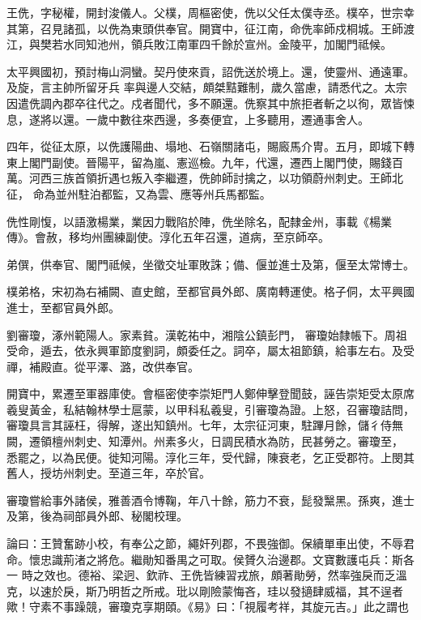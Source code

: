 \begin{pinyinscope}
 王侁，字秘權，開封浚儀人。父樸，周樞密使，侁以父任太僕寺丞。樸卒，世宗幸其第，召見諸孤，以侁為東頭供奉官。開寶中，征江南，命侁率師戍桐城。王師渡江，與樊若水同知池州，領兵敗江南軍四千餘於宣州。金陵平，加閣門祗候。



 太平興國初，預討梅山洞蠻。契丹使來貢，詔侁送於境上。還，使靈州、通遠軍。及旋，言主帥所留牙兵
 率與邊人交結，頗桀黠難制，歲久當慮，請悉代之。太宗因遣侁調內郡卒往代之。戍者聞代，多不願還。侁察其中旅拒者斬之以徇，眾皆悚息，遂將以還。一歲中數往來西邊，多奏便宜，上多聽用，遷通事舍人。



 四年，從征太原，以侁護陽曲、塌地、石嶺關諸屯，賜廄馬介冑。五月，即城下轉東上閣門副使。晉陽平，留為嵐、憲巡檢。九年，代還，遷西上閣門使，賜錢百萬。河西三族首領折遇乜叛入李繼遷，侁帥師討擒之，以功領蔚州刺史。王師北征，
 命為並州駐泊都監，又為雲、應等州兵馬都監。



 侁性剛愎，以語激楊業，業因力戰陷於陣，侁坐除名，配隸金州，事載《楊業傳》。會赦，移均州團練副使。淳化五年召還，道病，至京師卒。



 弟僎，供奉官、閣門祗候，坐徵交址軍敗誅；備、偃並進士及第，偃至太常博士。



 樸弟格，宋初為右補闕、直史館，至都官員外郎、廣南轉運使。格子侗，太平興國進士，至都官員外郎。



 劉審瓊，涿州範陽人。家素貧。漢乾祐中，湘陰公鎮彭門，
 審瓊始隸帳下。周祖受命，遁去，依永興軍節度劉詞，頗委任之。詞卒，屬太祖節鎮，給事左右。及受禪，補殿直。從平澤、潞，改供奉官。



 開寶中，累遷至軍器庫使。會樞密使李崇矩門人鄭伸擊登聞鼓，誣告崇矩受太原席羲叟黃金，私結翰林學士扈蒙，以甲科私羲叟，引審瓊為證。上怒，召審瓊詰問，審瓊具言其誣枉，得解，遂出知鎮州。七年，太宗征河東，駐蹕月餘，儲彳侍無闕，遷領檀州刺史、知潭州。州素多火，日調民積水為防，民甚勞之。審瓊至，
 悉罷之，以為民便。徙知河陽。淳化三年，受代歸，陳衰老，乞正受郡符。上閔其舊人，授坊州刺史。至道三年，卒於官。



 審瓊嘗給事外諸侯，雅善酒令博鞠，年八十餘，筋力不衰，髭發黳黑。孫爽，進士及第，後為祠部員外郎、秘閣校理。



 論曰：王贊奮跡小校，有奉公之節，繩奸列郡，不畏強御。保續單車出使，不辱君命。懷忠識荊渚之將危。繼勛知番禺之可取。侯贇久治邊郡。文寶數護屯兵：斯各一
 時之效也。德裕、梁迥、欽祚、王侁皆練習戎旅，頗著勛勞，然率強戾而乏溫克，以速於戾，斯乃明哲之所戒。玭以剛險蒙悔吝，珪以發擿肆威福，其不逞者歟！守素不事躁競，審瓊克享期頤。《易》曰：「視履考祥，其旋元吉。」此之謂也



\end{pinyinscope}